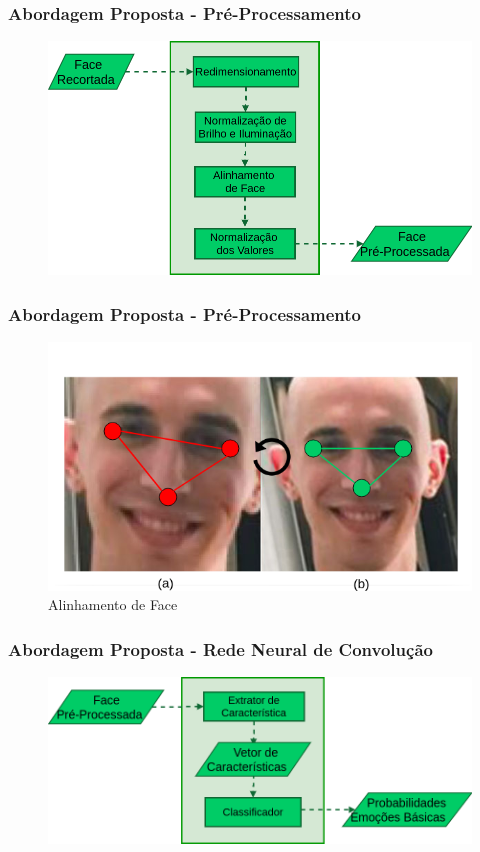 \documentclass{beamer}
\begin{document}
\begin{frame}
\frametitle{Abordagem Proposta - Pré-Processamento}
\begin{figure}
\centering
\includegraphics[scale=0.34]{figuras/abordagem_5.png}
\label{fig:arquitetura3}
\end{figure}
\end{frame}

\begin{frame}
\frametitle{Abordagem Proposta - Pré-Processamento}
\begin{figure}
\centering
\includegraphics[scale=0.26]{figuras/face_alinhada.png}
\caption{Alinhamento de Face}
\label{fig:face_alinhada}
\end{figure}
\end{frame}



\begin{frame}
\frametitle{Abordagem Proposta - Rede Neural de Convolução}
\begin{figure}
\centering
\includegraphics[scale=0.33]{figuras/abordagem_6.png}
\label{fig:arquitetura3}
\end{figure}
\end{frame}
\end{document}
